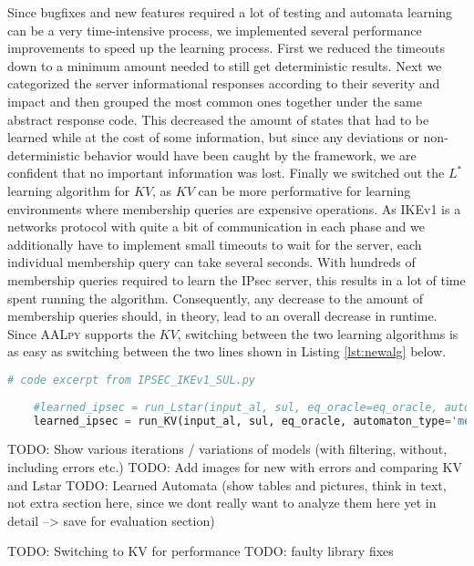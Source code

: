Since bugfixes and new features required a lot of testing and automata learning can be a very time-intensive process, we implemented several performance improvements to speed up the learning process. First we reduced the timeouts down to a minimum amount needed to still get deterministic results. Next we categorized the server informational responses according to their severity and impact and then grouped the most common ones together under the same abstract response code. This decreased the amount of states that had to be learned while at the cost of some information, but since any deviations or non-deterministic behavior would have been caught by the framework, we are confident that no important information was lost. Finally we switched out the $L^*$ learning algorithm for $KV$, as $KV$ can be more performative for learning environments where membership queries are expensive operations. As IKEv1 is a networks protocol with quite a bit of communication in each phase and we additionally have to implement small timeouts to wait for the server, each individual membership query can take several seconds. With hundreds of membership queries required to learn the IPsec server, this results in a lot of time spent running the algorithm. Consequently, any decrease to the amount of membership queries should, in theory, lead to an overall decrease in runtime. Since \textsc{AALpy} supports the $KV$, switching between the two learning algorithms is as easy as switching between the two lines shown in Listing \ref{lst:newalg} below.

\begin{lstlisting}[float=ht, caption=Switching Learning Algorithms, label=lst:newalg, numbers=none, language=python]
	# code excerpt from IPSEC_IKEv1_SUL.py
	
	#learned_ipsec = run_Lstar(input_al, sul, eq_oracle=eq_oracle, automaton_type='mealy', cache_and_non_det_check=True, print_level=3)
	learned_ipsec = run_KV(input_al, sul, eq_oracle, automaton_type='mealy', print_level=3, cex_processing='rs')
\end{lstlisting}

TODO: Show various iterations / variations of models (with filtering, without, including errors etc.) TODO: Add images for new with errors and comparing KV and Lstar
TODO: Learned Automata (show tables and pictures, think in text, not extra section here, since we dont really want to analyze them here yet in detail --> save for evaluation section)

TODO: Switching to KV for performance
TODO: faulty library fixes



